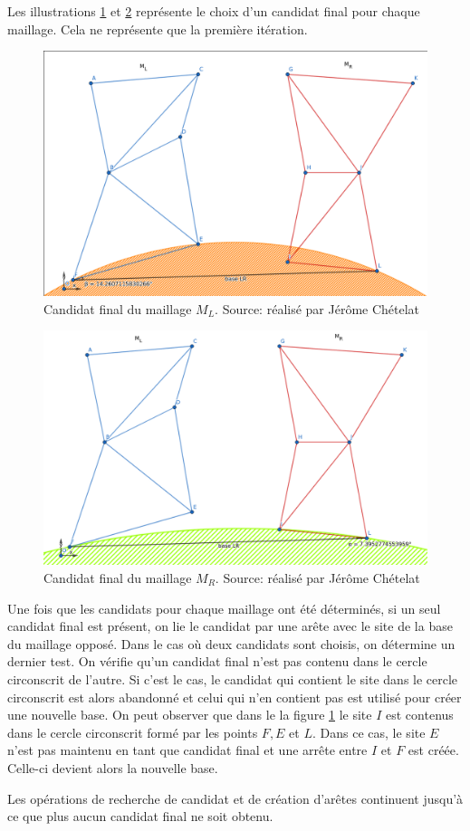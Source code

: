 Les illustrations \ref{fig:site_ML_candidate} et \ref{fig:site_MR_candidate} représente le choix d'un candidat final pour chaque maillage. Cela ne représente que la première itération.
\begin{figure}[htbp!]
    \centering
    \includegraphics[width=0.8\linewidth]{figures/site_ML.png}
    \caption{Candidat final du maillage $M_L$. Source: réalisé par Jérôme Chételat}
    \label{fig:site_ML_candidate}
\end{figure}

\begin{figure}[htpb!]
    \centering
    \includegraphics[width=0.8\linewidth]{figures/site_MR.png}
    \caption{Candidat final du maillage $M_R$. Source: réalisé par Jérôme Chételat}
    \label{fig:site_MR_candidate}
\end{figure}

Une fois que les candidats pour chaque maillage ont été déterminés, si un seul candidat final est présent, on lie le candidat par une arête avec le site de la base du maillage opposé. Dans le cas où deux candidats sont choisis, on détermine un dernier test. On vérifie qu'un candidat final n'est pas contenu dans le cercle circonscrit de l'autre. Si c'est le cas, le candidat qui contient le site dans le cercle circonscrit est alors abandonné et celui qui n'en contient pas est utilisé pour créer une nouvelle base. On peut observer que dans le la figure \ref{fig:site_ML_candidate} le site $I$ est contenus dans le cercle circonscrit formé par les points $F, E$ et $L$. Dans ce cas, le site $E$ n'est pas maintenu en tant que candidat final et une arrête entre $I$ et $F$ est créée. Celle-ci devient alors la nouvelle base.

Les opérations de recherche de candidat et de création d'arêtes continuent jusqu'à ce que plus aucun candidat final ne soit obtenu.
